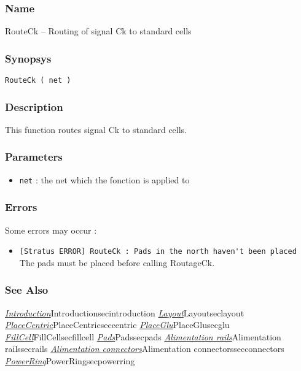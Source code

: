 \subsubsection{Name}

RouteCk -- Routing of signal Ck to standard cells

\subsubsection{Synopsys}

\begin{verbatim}
RouteCk ( net )
\end{verbatim}

\subsubsection{Description}

This function routes signal Ck to standard cells.
    
\subsubsection{Parameters}

\begin{itemize}
    \item \verb-net- : the net which the fonction is applied to
\end{itemize}
    
%
%
\subsubsection{Errors}

Some errors may occur :
\begin{itemize}
    \item \verb-[Stratus ERROR] RouteCk : Pads in the north haven't been placed-\\The pads must be placed before calling RoutageCk.
\end{itemize}

\subsubsection{See Also}

\hyperref[ref]{\emph{Introduction}}{}{Introduction}{secintroduction}
\hyperref[ref]{\emph{Layout}}{}{Layout}{seclayout}
\hyperref[ref]{\emph{PlaceCentric}}{}{PlaceCentric}{seccentric}
\hyperref[ref]{\emph{PlaceGlu}}{}{PlaceGlu}{secglu}
\hyperref[ref]{\emph{FillCell}}{}{FillCell}{secfillcell}
\hyperref[ref]{\emph{Pads}}{}{Pads}{secpads}
\hyperref[ref]{\emph{Alimentation rails}}{}{Alimentation rails}{secrails}
\hyperref[ref]{\emph{Alimentation connectors}}{}{Alimentation connectors}{secconnectors}
\hyperref[ref]{\emph{PowerRing}}{}{PowerRing}{secpowerring}
